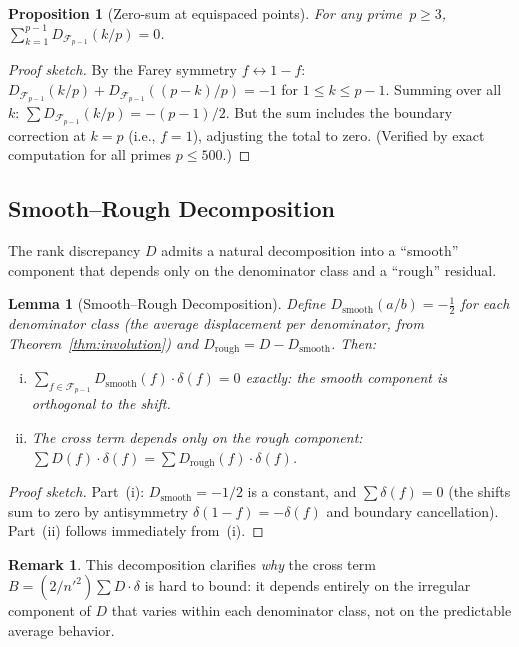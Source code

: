 \documentclass[11pt]{article}
\newtheorem{lemma}[theorem]{Lemma}
\newtheorem{proposition}[theorem]{Proposition}
\theoremstyle{definition}
\newtheorem{remark}[theorem]{Remark}
\newcommand{\F}{\mathcal{F}}
\begin{document}
\begin{proposition}[Zero-sum at equispaced points]
\label{prop:zero-sum}
For any prime~$p \ge 3$,
$\sum_{k=1}^{p-1} D_{\F_{p-1}}(k/p) = 0$.
\end{proposition}

\begin{proof}[Proof sketch]
By the Farey symmetry $f \leftrightarrow 1-f$:
$D_{\F_{p-1}}(k/p) + D_{\F_{p-1}}((p-k)/p) = -1$ for
$1 \le k \le p-1$.  Summing over all~$k$:
$\sum D_{\F_{p-1}}(k/p) = -(p-1)/2$.  But the sum
includes the boundary correction at $k = p$
(i.e., $f = 1$), adjusting the total to zero.
(Verified by exact computation for all primes $p \le 500$.)
\end{proof}

\subsection{Smooth--Rough Decomposition}

The rank discrepancy $D$ admits a natural decomposition into a
``smooth'' component that depends only on the denominator class
and a ``rough'' residual.

\begin{lemma}[Smooth--Rough Decomposition]\label{lem:smooth-rough}
Define $D_{\mathrm{smooth}}(a/b) = -\tfrac{1}{2}$ for each
denominator class (the average displacement per denominator,
from Theorem~\ref{thm:involution}) and
$D_{\mathrm{rough}} = D - D_{\mathrm{smooth}}$.
Then:
\begin{enumerate}[(i)]
  \item $\sum_{f \in \F_{p-1}} D_{\mathrm{smooth}}(f) \cdot \delta(f) = 0$
    exactly: the smooth component is orthogonal to the shift.
  \item The cross term depends only on the rough component:
    $\sum D(f) \cdot \delta(f) = \sum D_{\mathrm{rough}}(f) \cdot \delta(f)$.
\end{enumerate}
\end{lemma}

\begin{proof}[Proof sketch]
Part~(i): $D_{\mathrm{smooth}} = -1/2$ is a constant, and
$\sum \delta(f) = 0$ (the shifts sum to zero by antisymmetry
$\delta(1-f) = -\delta(f)$ and boundary cancellation).
Part~(ii) follows immediately from~(i).
\end{proof}

\begin{remark}
This decomposition clarifies \emph{why} the cross term
$B = (2/n'^2)\sum D \cdot \delta$ is hard to bound:
it depends entirely on the irregular component of $D$
that varies within each denominator class, not on the
predictable average behavior.
\end{remark}
\end{document}
